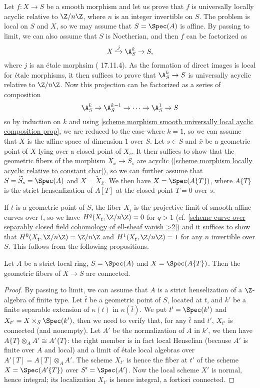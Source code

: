 Let $f:X\to S$ be a smooth morphism and let us prove that $f$ is universally locally acyclic relative to $\Z/n\Z$, where $n$ is an integer invertible on $S$. The problem is local on $S$ and $X$, so we may assume that $S=\Spec(A)$ is affine. By passing to limit, we can also assume that $S$ is Noetherian, and then $f$ can be factorized as
\[X\stackrel{j}{\hookrightarrow}\A_S^k\to S,\]
where $j$ is an \'etale morphsim (\cite{EGA4-4} 17.11.4). As the formation of direct images is local for \'etale morphisms, it then suffices to prove that $\A_S^k\to S$ is universally acyclic relative to $\Z/n\Z$. Now this projection can be factorized as a series of composition
\[\A_S^k\to\A_S^{k-1}\to\cdots\to\A_S^1\to S\]
so by induction on $k$ and using \cref{scheme morphism smooth universally local ayclic composition prop}, we are reduced to the case where $k=1$, so we can assume that $X$ is the affine space of dimension $1$ over $S$. Let $s\in S$ and $\bar{x}$ be a geometric point of $X$ lying over a closed point of $X_{\bar{s}}$. It then suffices to show that the geometric fibers of the morphism $\widetilde{X}_{\bar{x}}\to\widetilde{S}_{\bar{s}}$ are acyclic (\cref{scheme morphism locally acyclic relative to constant char}), so we can further assume that $S=\widetilde{S}_{\bar{s}}=\Spec(A)$ and $X=\widetilde{X}_{\bar{x}}$. We then have $X=\Spec(A\{T\})$, where $A\{T\}$ is the strict hensenlization of $A[T]$ at the closed point $T=0$ over $s$.\par
If $\bar{t}$ is a geometric point of $S$, the fiber $X_{\bar{t}}$ is the projective limit of smooth affine curves over $\bar{t}$, so we have $H^q(X_{\bar{t}},\Z/n\Z)=0$ for $q>1$ (cf. \cref{scheme curve over separably closed field cohomology of ell-sheaf vanish >2}) and it suffices to show that $H^0(X_{\bar{t}},\Z/n\Z)=\Z/n\Z$ and $H^1(X_{\bar{t}},\Z/n\Z)=1$ for any $n$ invertible over $S$. This follows from the following propositions.

\begin{proposition}\label{scheme strict local affine space geometric fiber connected}
Let $A$ be a strict local ring, $S=\Spec(A)$ and $X=\Spec(A\{T\})$. Then the geometric fibers of $X\to S$ are connected.
\end{proposition}
\begin{proof}
By passing to limit, we can assume that $A$ is a strict henselization of a $\Z$-algebra of finite type. Let $\bar{t}$ be a geometric point of $S$, located at $t$, and $k'$ be a finite separable extension of $\kappa(t)$ in $\kappa(\bar{t})$. We put $t'=\Spec(k')$ and $X_{t'}=X\times_S\Spec(k')$, then we need to verify that, for any $\bar{t}$ and $t'$, $X_{t'}$ is connected (and nonempty). Let $A'$ be the normalization of $A$ in $k'$, we then have $A\{T\}\otimes_AA'\cong A'\{T\}$: the right member is in fact local Henselian (because $A'$ is finite over $A$ and local) and a limit of \'etale local algebras over $A'[T]=A[T]\otimes_AA'$. The scheme $X_{t'}$ is hence the fiber at $t'$ of the scheme $X=\Spec(A'\{T\})$ over $S'=\Spec(A')$. Now the local scheme $X'$ is normal, hence integral; its localization $X_{t'}$ is hence integral, a fortiori connected. 
\end{proof}


